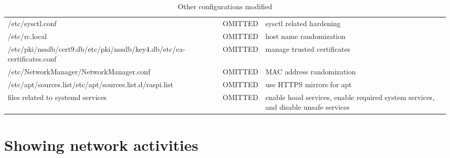 \documentclass[mscthesis]{usiinfthesis}
\begin{document}
\begin{landscape}
\begin{table}[H]
\begin{tabular}{|p{70mm}|p{40mm}|p{80mm}|}
      /etc/sysctl.conf                                                                         & OMITTED                                                                                                             & sysctl related hardening                                                           \\
      /etc/rc.local                                                                            & OMITTED                                                                                                             & host name randomization                                                            \\
      /etc/pki/nssdb/cert9.db\newline /etc/pki/nssdb/key4.db\newline /etc/ca-certificates.conf & OMITTED                                                                                                             & manage trusted certificates                                                        \\
      /etc/NetworkManager/NetworkManager.conf                                                  & OMITTED                                                                                                             & MAC address randomization                                                          \\
      /etc/apt/sources.list\newline /etc/apt/sources.list.d/raspi.list                         & OMITTED                                                                                                             & use HTTPS mirrors for apt                                                          \\
      files related to systemd services                                                        & OMITTED                                                                                                             & enable hood services, enable required system services, and disable unsafe services \\
      \hline
    \end{tabular}
    \caption{Other configurations modified}
    \label{tab:other_config}
  \end{table}
\end{landscape}


\chapter{Showing network activities}\label{cha:show}
\end{document}
